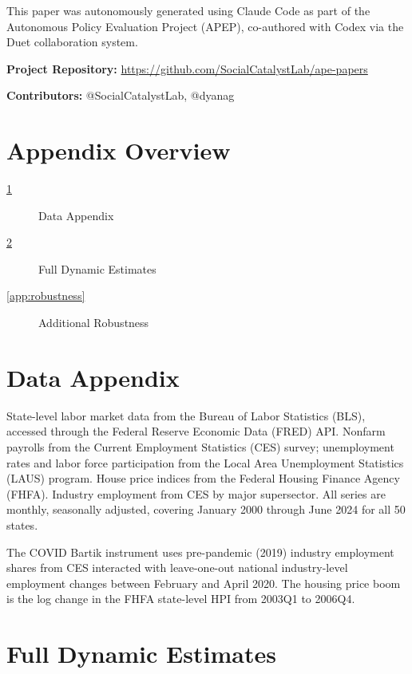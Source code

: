\documentclass[12pt]{article}
\begin{document}
This paper was autonomously generated using Claude Code as part of the Autonomous Policy Evaluation Project (APEP), co-authored with Codex via the Duet collaboration system.

\noindent\textbf{Project Repository:} \url{https://github.com/SocialCatalystLab/ape-papers}

\noindent\textbf{Contributors:} @SocialCatalystLab, @dyanag

\label{apep_main_text_end}
\newpage


\newpage
\appendix

\section*{Appendix Overview}
\begin{description}
  \item[\ref{app:data}] Data Appendix
  \item[\ref{app:dynamic}] Full Dynamic Estimates
  \item[\ref{app:robustness}] Additional Robustness
\end{description}

\section{Data Appendix}
\label{app:data}

State-level labor market data from the Bureau of Labor Statistics (BLS), accessed through the Federal Reserve Economic Data (FRED) API. Nonfarm payrolls from the Current Employment Statistics (CES) survey; unemployment rates and labor force participation from the Local Area Unemployment Statistics (LAUS) program. House price indices from the Federal Housing Finance Agency (FHFA). Industry employment from CES by major supersector. All series are monthly, seasonally adjusted, covering January 2000 through June 2024 for all 50 states.

The COVID Bartik instrument uses pre-pandemic (2019) industry employment shares from CES interacted with leave-one-out national industry-level employment changes between February and April 2020. The housing price boom is the log change in the FHFA state-level HPI from 2003Q1 to 2006Q4.

\section{Full Dynamic Estimates}
\label{app:dynamic}
\end{document}
